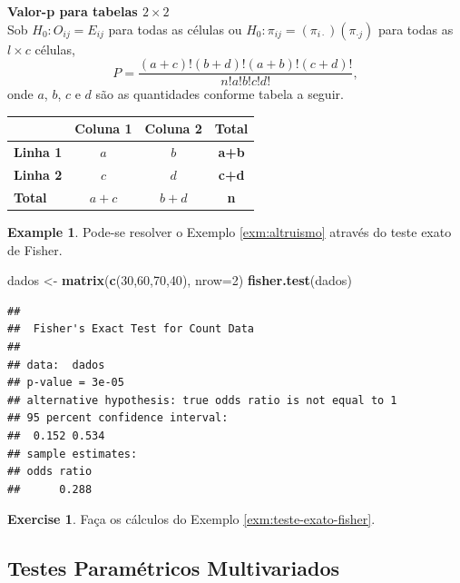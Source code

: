 \documentclass[
]{book}
\newenvironment{Shaded}{\begin{snugshade}}{\end{snugshade}}
\newcommand{\DataTypeTok}[1]{\textcolor[rgb]{0.13,0.29,0.53}{#1}}
\newcommand{\DecValTok}[1]{\textcolor[rgb]{0.00,0.00,0.81}{#1}}
\newcommand{\KeywordTok}[1]{\textcolor[rgb]{0.13,0.29,0.53}{\textbf{#1}}}
\newcommand{\NormalTok}[1]{#1}
\newcommand{\StringTok}[1]{\textcolor[rgb]{0.31,0.60,0.02}{#1}}
\theoremstyle{definition}
\theoremstyle{definition}
\newtheorem{example}{Example}[chapter]
\theoremstyle{definition}
\newtheorem{exercise}{Exercise}[chapter]
\theoremstyle{remark}
\begin{document}
\textbf{Valor-p para tabelas \(2 \times 2\)}\\
Sob \(H_0: O_{ij}=E_{ij}\) para todas as células ou \(H_0: \pi_{ij}=(\pi_{i\cdot})(\pi_{\cdot j})\) para todas as \(l \times c\) células,
\begin{equation}
P = \frac{(a+c)!(b+d)!(a+b)!(c+d)!}{n!a!b!c!d!},
\label{eq:qui-teste-exato-fisher}
\end{equation}
onde \(a\), \(b\), \(c\) e \(d\) são as quantidades conforme tabela a seguir.

\begin{longtable}[]{@{}lccc@{}}
\toprule
& Coluna 1 & Coluna 2 & Total\tabularnewline
\midrule
\endhead
\textbf{Linha 1} & \(a\) & \(b\) & \textbf{a+b}\tabularnewline
\textbf{Linha 2} & \(c\) & \(d\) & \textbf{c+d}\tabularnewline
\textbf{Total} & \textbf{\(a+c\)} & \textbf{\(b+d\)} & \textbf{n}\tabularnewline
\bottomrule
\end{longtable}

\begin{example}
\protect\hypertarget{exm:teste-exato-fisher}{}{\label{exm:teste-exato-fisher} }Pode-se resolver o Exemplo \ref{exm:altruismo} através do teste exato de Fisher.
\end{example}

\begin{Shaded}
\begin{Highlighting}[]
\NormalTok{dados \textless{}{-}}\StringTok{ }\KeywordTok{matrix}\NormalTok{(}\KeywordTok{c}\NormalTok{(}\DecValTok{30}\NormalTok{,}\DecValTok{60}\NormalTok{,}\DecValTok{70}\NormalTok{,}\DecValTok{40}\NormalTok{), }\DataTypeTok{nrow=}\DecValTok{2}\NormalTok{)}
\KeywordTok{fisher.test}\NormalTok{(dados)}
\end{Highlighting}
\end{Shaded}

\begin{verbatim}
## 
##  Fisher's Exact Test for Count Data
## 
## data:  dados
## p-value = 3e-05
## alternative hypothesis: true odds ratio is not equal to 1
## 95 percent confidence interval:
##  0.152 0.534
## sample estimates:
## odds ratio 
##      0.288
\end{verbatim}

\begin{exercise}
\protect\hypertarget{exr:exercicio-teste-exato-fisher}{}{\label{exr:exercicio-teste-exato-fisher} }Faça os cálculos do Exemplo \ref{exm:teste-exato-fisher}.
\end{exercise}

\hypertarget{testes-paramuxe9tricos-multivariados}{%
\subsection{Testes Paramétricos Multivariados}\label{testes-paramuxe9tricos-multivariados}}
\end{document}
